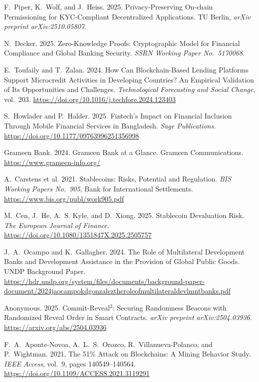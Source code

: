 \documentclass[12pt, a4paper]{report}
\begin{document}
{\begin{enumerate}[label={[\arabic*]}]
\item F.~Piper, K.~Wolf, and J.~Heiss. 2025. Privacy-Preserving On-chain Permissioning for KYC-Compliant Decentralized Applications. TU Berlin, \emph{arXiv preprint arXiv:2510.05807}.

\item N.~Decker. 2025. Zero-Knowledge Proofs: Cryptographic Model for Financial Compliance and Global Banking Security. \emph{SSRN Working Paper No.~5170068}.

\item E.~Toufaily and T.~Zalan. 2024. How Can Blockchain-Based Lending Platforms Support Microcredit Activities in Developing Countries? An Empirical Validation of Its Opportunities and Challenges. \emph{Technological Forecasting and Social Change}, vol.~203. \url{https://doi.org/10.1016/j.techfore.2024.123403}

\item S.~Howlader and P.~Halder. 2025. Fintech's Impact on Financial Inclusion Through Mobile Financial Services in Bangladesh. \emph{Sage Publications}. \url{https://doi.org/10.1177/09763996251356998}

\item Grameen Bank. 2024. Grameen Bank at a Glance. Grameen Communications. \url{https://www.grameen-info.org/}

\item A.~Carstens et al. 2021. Stablecoins: Risks, Potential and Regulation. \emph{BIS Working Papers No.~905}, Bank for International Settlements. \url{https://www.bis.org/publ/work905.pdf}

\item M.~Cen, J.~He, A.~S. Kyle, and D.~Xiong. 2025. Stablecoin Devaluation Risk. \emph{The European Journal of Finance}. \url{https://doi.org/10.1080/1351847X.2025.2505757}

\item J.~A.~Ocampo and K.~Gallagher. 2024. The Role of Multilateral Development Banks and Development Assistance in the Provision of Global Public Goods. UNDP Background Paper. \url{https://hdr.undp.org/system/files/documents/background-paper-document/2024jaocampokdgonzaleztheroleofmultilateraldevlmntbanks.pdf}

\item Anonymous. 2025. Commit-Reveal$^2$: Securing Randomness Beacons with Randomized Reveal Order in Smart Contracts. \emph{arXiv preprint arXiv:2504.03936}. \url{https://arxiv.org/abs/2504.03936}

\item F.~A.~Aponte-Novoa, A.~L.~S.~Orozco, R.~Villanueva-Polanco, and P.~Wightman. 2021. The 51\% Attack on Blockchains: A Mining Behavior Study. \emph{IEEE Access}, vol.~9, pages 140549--140564. \url{https://doi.org/10.1109/ACCESS.2021.3119291}


\end{enumerate}}
\end{document}
